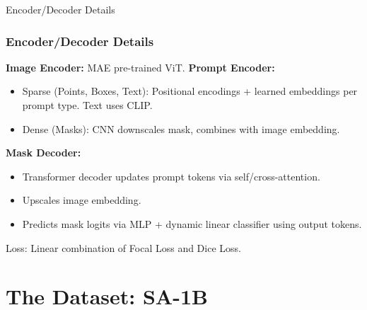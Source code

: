 \documentclass{beamer}
\begin{document}
\begin{frame}{Encoder/Decoder Details}
    \frametitle{Encoder/Decoder Details}
    \textbf{Image Encoder:} MAE pre-trained ViT.
    \textbf{Prompt Encoder:}
    \begin{itemize}
        \item Sparse (Points, Boxes, Text): Positional encodings + learned embeddings per prompt type. Text uses CLIP.
        \item Dense (Masks): CNN downscales mask, combines with image embedding.
    \end{itemize}
    \textbf{Mask Decoder:}
    \begin{itemize}
        \item Transformer decoder updates prompt tokens via self/cross-attention.
        \item Upscales image embedding.
        \item Predicts mask logits via MLP + dynamic linear classifier using output tokens.
    \end{itemize}
    Loss: Linear combination of Focal Loss and Dice Loss.
\end{frame}


\section{The Dataset: SA-1B}
\end{document}
